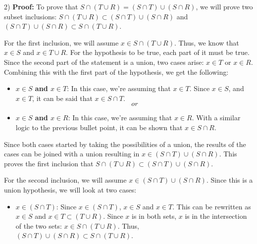 \begin{paragraph}{2)}
        \textbf{Proof:} To prove that $S \cap (T \cup R) = (S \cap T) \cup (S \cap R)$,
        we will prove two subset inclusions: 
        $S \cap (T \cup R) \subset (S \cap T) \cup (S \cap R)$ and 
        $(S \cap T) \cup (S \cap R) \subset S \cap (T \cup R)$.
        \spacing

        For the first inclusion, we will assume $x \in S \cap (T \cup R)$.
        Thus, we know that $x \in S$ and $x \in T \cup R$. For the hypothesis to be
        true, each part of it must be true. Since the second part of the statement is a
        union, two cases arise: $x \in T$ or $x \in R$. Combining this with the first
        part of the hypothesis, we get the following:
        
        \begin{itemize}
            \item{
                \textbf{$x \in S$ and $x \in T$}: In this case, we're assuming that $x \in T$.
                Since $x \in S$, and $x \in T$, it can be said that $x \in S \cap T$.
            }
            $$or$$

            \item{
                \textbf{$x \in S$ and $x \in R$}: In this case, we're assuming that $x \in R$.
                With a similar logic to the previous bullet point, it can be shown that $x \in S \cap R$.
            }
        \end{itemize}

        Since both cases started by taking the possibilities of a union, the results of the 
        cases can be joined with a union resulting in $x \in (S \cap T) \cup (S \cap R)$.
        This proves the first inclusion that $S \cap (T \cup R) \subset (S \cap T) \cup (S \cap R)$.
        \spacing

        For the second inclusion, we will assume $x \in (S \cap T) \cup (S \cap R)$.
        Since this is a union hypothesis, we will look at two cases: 
        
        \begin{itemize}
            \item{
                $x \in (S \cap T)$: Since $x \in (S \cap T)$, $x \in S$ and $x \in T$. This can be
                rewritten as $x \in S$ and $x \in T \subset (T \cup R)$. Since $x$ is in both sets, $x$
                is in the intersection of the two sets: $x \in S \cap (T \cup R)$. Thus,
                $(S \cap T) \cup (S \cap R) \subset S \cap (T \cup R)$.
            }


\end{itemize}
\end{paragraph}
